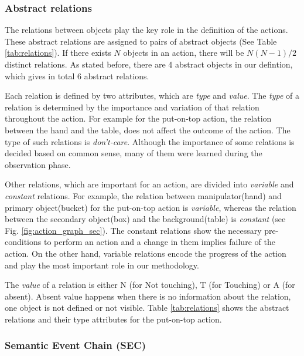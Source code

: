\subsubsection{Abstract relations}

The relations between objects play the key role in the definition of the actions.
These abstract relations are assigned to pairs of abstract objects (See Table \ref{tab:relations}).
If there exists $N$ objects in an action,
there will be $N(N-1)/2$ distinct relations.
As stated before, there are 4 abstract objects in our defintion, which gives in total 6 abstract relations.


Each relation is defined by two attributes, which are  \emph{type} and \emph{value}.
The \emph{type} of a relation is determined by the importance and variation of that relation throughout the action.
For example for the put-on-top action, the relation between the hand and the table, does not affect the outcome of the action.
The type of such relations is \emph{don't-care}.
Although the importance of some relations is decided based on common sense, many of them were learned during the observation phase.

Other relations, which are important for an action, are divided into \emph{variable} and \emph{constant} relations.
For example, the relation between manipulator(hand) and primary object(bucket) for the put-on-top action is \emph{variable},
whereas the relation between the secondary object(box) and the background(table) is \emph{constant} (see Fig. \ref{fig:action_graph_sec}).
The constant relations show the necessary pre-conditions to perform an action and a change in them implies failure of the action.
On the other hand, variable relations encode the progress of the action and play the most important role in our methodology.

The \emph{value} of a relation is either N (for Not touching), T (for Touching) or A (for absent).
Absent value happens when there is no information about the relation, \eg one object is not defined or not visible.
Table \ref{tab:relations} shows the abstract relations and their type attributes for the put-on-top action.



\subsubsection{Semantic Event Chain (SEC)}
\label{sec:SEC}


